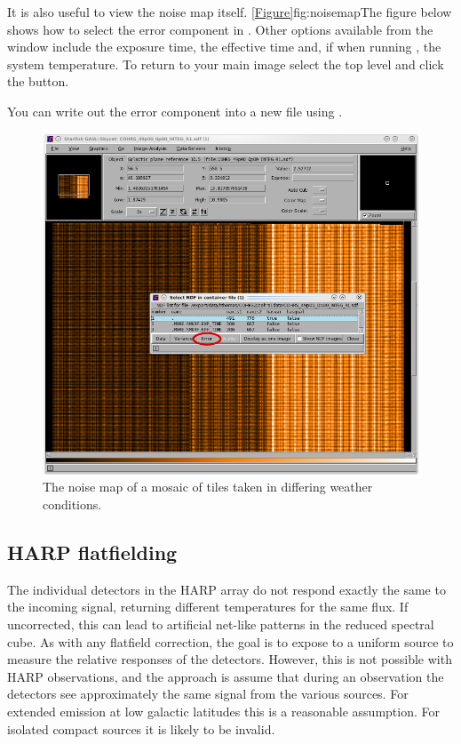 \documentclass[11pt,oneside,chapters]{starlink}
\begin{document}
It is also useful to view the noise map itself.
\cref{Figure}{fig:noisemap}{The figure below} shows how to select the
error component in \gaia. Other options available from the
 window include the exposure
time, the effective time and, if  when running
\makecube, the system temperature. To return to your main image select
the top level and click the  button.

\begin{tip}
You can write out the error component into a new file using
\ndfcopy.
\begin{terminalv}
\end{terminalv}
\end{tip}


\begin{figure}[h!]
\begin{center}
\includegraphics[width=0.6\linewidth]{sc20_noimap}
\caption[The noise map of a mosaic of tiles.]{\label{fig:noisemap}
  The noise map of a mosaic of tiles taken in differing weather
  conditions.}
\end{center}
\end{figure}


\subsection{HARP flatfielding}
\label{sec:flatfield}

The individual detectors in the HARP array do not respond exactly the
same to the incoming signal, returning different temperatures for the
same flux.  If uncorrected, this can lead to artificial net-like
patterns in the reduced spectral cube.  As with any flatfield
correction, the goal is to expose to a uniform source to measure the
relative responses of the detectors.  However, this is not possible
with HARP observations, and the approach is assume that during an
observation the detectors see approximately the same signal from the
various sources.  For extended emission at low galactic latitudes this
is a reasonable assumption.  For isolated compact sources it is likely
to be invalid.
\end{document}
